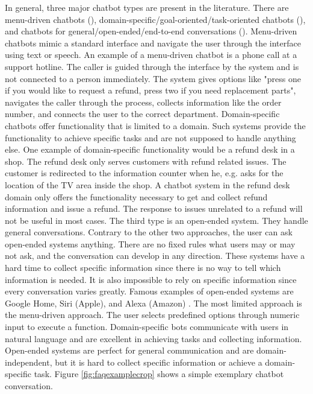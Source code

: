 In general, three major chatbot types are present in the literature.
There are menu-driven chatbots (\citet{singhbuilding}), domain-specific/goal-oriented/task-oriented chatbots (\citet{deshpande2017survey, luis2015williams, braunEvaluatingNLU, williams2017hybrid}),
and chatbots for general/open-ended/end-to-end conversations (\citet{brandtzaeg2018chatbots, singhbuilding}).
Menu-driven chatbots mimic a standard interface and navigate the user through the interface using text or speech.
An example of a menu-driven chatbot is a phone call at a support hotline.
The caller is guided through the interface by the system and is not connected to a person immediately.
The system gives options like "press one if you would like to request a refund, press two if you need replacement parts", navigates the caller through the process, collects information like the order number, and 
connects the user to the correct department.
Domain-specific chatbots offer functionality that is limited to a domain.
Such systems provide the functionality to achieve specific tasks and are not supposed to handle anything else.
One example of domain-specific functionality would be a refund desk in a shop.
The refund desk only serves customers with refund related issues.
The customer is redirected to the information counter when he, e.g. asks for the location of the TV area inside the shop.
A chatbot system in the refund desk domain only offers the functionality necessary to get and collect refund information and issue a refund. 
The response to issues unrelated to a refund will not be useful in most cases.
The third type is an open-ended system.
They handle general conversations.
Contrary to the other two approaches, the user can ask open-ended systems anything. 
There are no fixed rules what users may or may not ask, and the conversation can develop in any direction.
These systems have a hard time to collect specific information since there is no way to tell which information is needed.
It is also impossible to rely on specific information since every conversation varies greatly.
Famous examples of open-ended systems are Google Home, Siri (Apple), and Alexa (Amazon) \cite{singhbuilding}.
The most limited approach is the menu-driven approach. 
The user selects predefined options through numeric input to execute a function.
Domain-specific bots communicate with users in natural language and are excellent in achieving tasks and collecting information.
Open-ended systems are perfect for general communication and are domain-independent, but it is hard to collect specific information
or achieve a domain-specific task. 
Figure \ref{fig:faqexamplecrop} shows a simple exemplary chatbot conversation.

